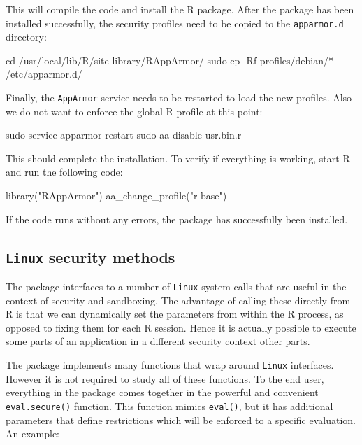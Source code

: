 \documentclass{jss}
\newcommand{\R}{\textsf{R}\xspace}
\newcommand{\AppArmor}{\texttt{AppArmor}\xspace}
\newcommand{\RAppArmor}{\pkg{RAppArmor}\xspace}
\newcommand{\Linux}{\texttt{Linux}\xspace}
\begin{document}
This will compile the  code and install the \R
package. After the package has been installed successfully, the security
profiles need to be copied to the \texttt{apparmor.d} directory:

\begin{CodeChunk}
\begin{CodeInput}
cd /usr/local/lib/R/site-library/RAppArmor/
sudo cp -Rf profiles/debian/* /etc/apparmor.d/
\end{CodeInput}
\end{CodeChunk}

Finally, the \AppArmor service needs to be restarted to load the new profiles.
Also we do not want to enforce the global \R profile at this point:

\begin{CodeChunk}
\begin{CodeInput}
sudo service apparmor restart
sudo aa-disable usr.bin.r
\end{CodeInput}
\end{CodeChunk}

This should complete the installation. To verify if everything is working, start
\R and run the following code:

\begin{CodeChunk}
\begin{CodeInput}
library("RAppArmor")
aa_change_profile("r-base")
\end{CodeInput}
\end{CodeChunk}

If the code runs without any errors, the package has successfully been
installed. 

\subsection[Linux security methods]{\Linux security methods}

The \RAppArmor package interfaces to a number of \Linux system calls that
are useful in the context of security and sandboxing. The advantage of calling
these directly from \R is that we can dynamically set the parameters
from within the \R process, as opposed to fixing them for each
\R session. Hence it is actually possible to execute some parts of an
application in a different security context other parts.

The package implements many functions that wrap around \Linux
{} interfaces. However it is not required to study all of these
functions. To the end user, everything in the package comes together in the
powerful and convenient \texttt{eval.secure()} function. This function mimics
\texttt{eval()}, but it has additional parameters that define restrictions
which will be enforced to a specific evaluation. An example:
\end{document}
